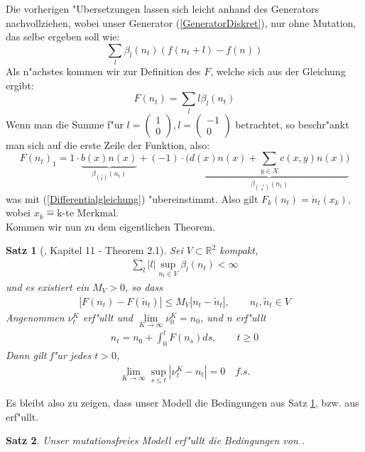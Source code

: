 \documentclass[11pt, a4paper, german]{article}
\theoremstyle{plain}
\newtheorem{satz}{Satz}[section]
\newcommand{\tvec}[2]{\begin{pmatrix}#1\\#2\end{pmatrix}}
\begin{document}
	Die vorherigen "Ubersetzungen lassen sich leicht anhand des Generators nachvollziehen, wobei unser Generator (\ref{GeneratorDiskret}), nur ohne Mutation, das selbe ergeben soll wie: 
	\[ \sum_l \beta_l(n_t)(f(n_t + l) - f(n)) \]
	Als n"achstes kommen wir zur Definition des $ F $, welche sich aus der Gleichung \cite[Kapitel 6 - (2.2)]{ethier2009markov} ergibt:
	\[ F(n_t) = \sum_l l \beta_l (n_t) \]
	Wenn man die Summe f"ur $ l = \tvec{1}{0}, l = \tvec{-1}{0} $ betrachtet, so beschr"ankt man sich auf die erste Zeile der Funktion, also:
	\[ F(n_t)_1 = 1 \cdot \underbrace{b(x)n(x)}_{\beta_{\binom{1}{0}} (n_t)} +  (-1) \cdot ( \underbrace{d(x)n(x) + \sum_{y \in X} c(x,y)n(x))}_{\beta_{\binom{-1}{0}} (n_t)} \]
	was mit (\ref{Differentialgleichung}) "ubereinstimmt. Also gilt $ F_k(n_t) = \dot{n}_t(x_k) $, wobei $ x_k \hat{=} \text{k-te Merkmal} $.\\
	Kommen wir nun zu dem eigentlichen Theorem.
	
	\begin{satz}[\cite{ethier2009markov}, Kapitel 11 - Theorem 2.1]\label{Konvegenzsatz}
		Sei $ V \subset \mathbb{R}^2 $ kompakt,
		\begin{align}
			\sum_l |l| \sup_{n_t \in V} \beta_l(n_t) < \infty \label{RatenEndlich}
		\end{align}
		und es existiert ein $ M_V > 0 $, so dass
		\begin{align}
			|F(n_t) - F(\tilde{n}_t)| \le M_V|n_t - \tilde{n}_t|, \qquad n_t, \tilde{n}_t \in V \label{Lipschitz}
		\end{align}
		Angenommen $ \nu_t^K $ erf"ullt \cite[Kapitel 11 - (2.3)]{ethier2009markov} und $ \lim\limits_{K \to \infty} \nu_0^K = n_0 $, und n erf"ullt
		\begin{align}
			n_t = n_0 + \int_{0}^{t} F(n_s) ds, \qquad t \ge 0 \label{Integralgleichung}
		\end{align}
		Dann gilt f"ur jedes $ t > 0 $,
		\begin{align}
			\lim\limits_{K \to \infty} \sup_{s \le t} | \nu_t^K - n_t | = 0 \quad f.s. \label{Kovergenzbehauptung}
		\end{align}
	\end{satz}
	
	Es bleibt also zu zeigen, dass unser Modell die Bedingungen aus Satz \ref{Konvegenzsatz}, bzw. aus \cite[Kap. 11 - \textbf{Theorem 2.1}]{ethier2009markov} erf"ullt.

	\begin{satz}
		Unser mutationsfreies Modell erf"ullt die Bedingungen von \cite[Kap. 11 - \textbf{Theorem 2.1}]{ethier2009markov}.
	\end{satz}
	
\end{document}
